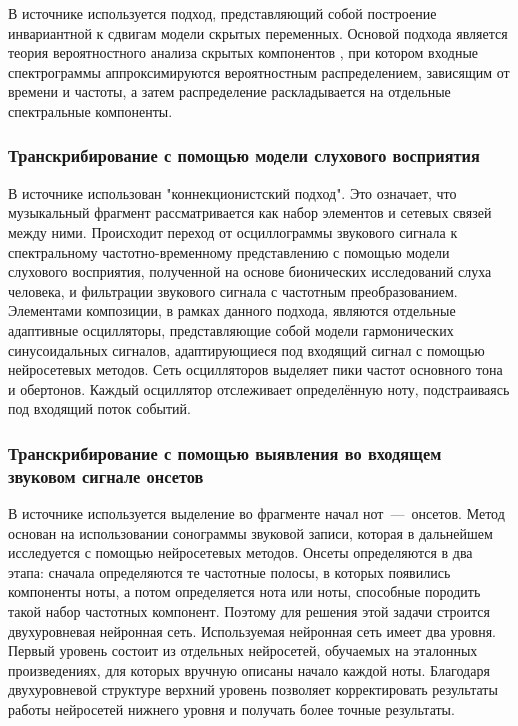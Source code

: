 В источнике \cite{bib5} используется подход, представляющий собой построение инвариантной к сдвигам модели скрытых переменных. Основой подхода является теория вероятностного анализа скрытых компонентов \cite{bib6}, при котором входные спектрограммы аппроксимируются вероятностным распределением, зависящим от времени и частоты, а затем распределение раскладывается на отдельные спектральные компоненты. 

\subsubsection{Транскрибирование с помощью модели слухового восприятия}

В источнике \cite{bib7} использован "коннекционистский подход". Это означает, что музыкальный фрагмент рассматривается как набор элементов и сетевых связей между ними. Происходит переход от осциллограммы звукового сигнала к спектральному частотно-временному представлению с помощью модели слухового восприятия, полученной на основе бионических исследований слуха человека, и фильтрации звукового сигнала с частотным преобразованием. Элементами композиции, в рамках данного подхода, являются отдельные адаптивные осцилляторы, представляющие собой модели гармонических синусоидальных сигналов, адаптирующиеся под входящий сигнал с помощью нейросетевых методов. Сеть осцилляторов выделяет пики частот основного тона и обертонов. Каждый осциллятор отслеживает определённую ноту, подстраиваясь под входящий поток событий.

\subsubsection{Транскрибирование с помощью выявления во входящем звуковом сигнале онсетов}

В источнике \cite{bib8} используется выделение во фрагменте начал нот~---~онсетов. 
Метод основан на использовании сонограммы звуковой записи, которая в дальнейшем исследуется с помощью нейросетевых методов. Онсеты определяются в два этапа: сначала определяются те частотные полосы, в которых появились компоненты ноты, а потом определяется нота или ноты, способные породить такой набор частотных компонент. Поэтому для решения этой задачи строится двухуровневая нейронная сеть. Используемая нейронная сеть имеет два уровня. Первый уровень состоит из отдельных нейросетей, обучаемых на эталонных произведениях, для которых вручную описаны начало каждой ноты. Благодаря двухуровневой структуре верхний уровень позволяет корректировать результаты работы нейросетей нижнего уровня и получать более точные результаты.  

